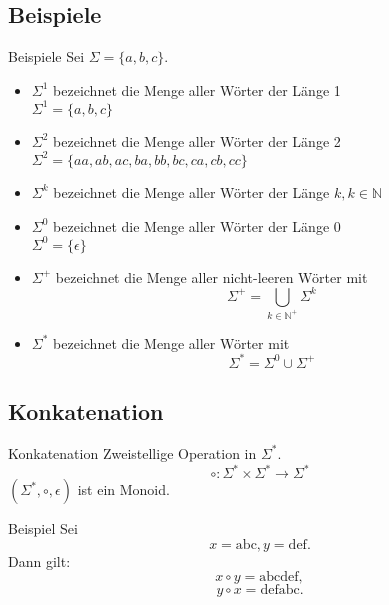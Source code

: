\documentclass[]{beamer}
\begin{document}
\subsection{Beispiele}
\begin{frame}[squeeze]{}{}
  \begin{block}{Beispiele}
    Sei $\Sigma = \{a, b, c\}$.
    \begin{itemize}
      \item<2-> $\Sigma^1$ bezeichnet die Menge aller Wörter der Länge 1 \\
                $\Sigma^1 = \{a, b, c\}$ \\
      \item<3-> $\Sigma^2$ bezeichnet die Menge aller Wörter der Länge 2 \\
                $\Sigma^2 = \{aa, ab, ac, ba, bb, bc, ca, cb, cc\}$ \\
      \item<4-> $\Sigma^k$ bezeichnet die Menge aller Wörter der Länge $k, k \in \mathbb{N}$ \\
      \item<5-> $\Sigma^0$ bezeichnet die Menge aller Wörter der Länge $0$ \\
                $\Sigma^0 = \{\epsilon\}$
      \item<6-> $\Sigma^+$ bezeichnet die Menge aller nicht-leeren Wörter mit
                \[\Sigma^+ = \underset{k \in \mathbb{N}^+}{\bigcup} \Sigma^k\]
      \item<7-> $\Sigma^*$ bezeichnet die Menge aller Wörter mit \\ 
                \[\Sigma^* = \Sigma^0 \cup \Sigma^+\]
    \end{itemize}
    \vspace*{-1em}
  \end{block}
\end{frame}

\subsection{Konkatenation}
\begin{frame}[<+->][squeeze]{}{}
  \begin{block}{Konkatenation}
    Zweistellige Operation in $\Sigma^*$.
      \[\circ : \Sigma^* \times \Sigma^* \rightarrow \Sigma^*\]
      $(\Sigma^*, \circ, \epsilon)$ ist ein Monoid.
  \end{block}
  
  \begin{block}{Beispiel}
    Sei 
      \[x = \text{abc}, y = \text{def}.\]
    Dann gilt:
      \[x \circ y = \text{abcdef},\]
      \[y \circ x = \text{defabc}.\]
  \end{block}
\end{frame}
\end{document}
